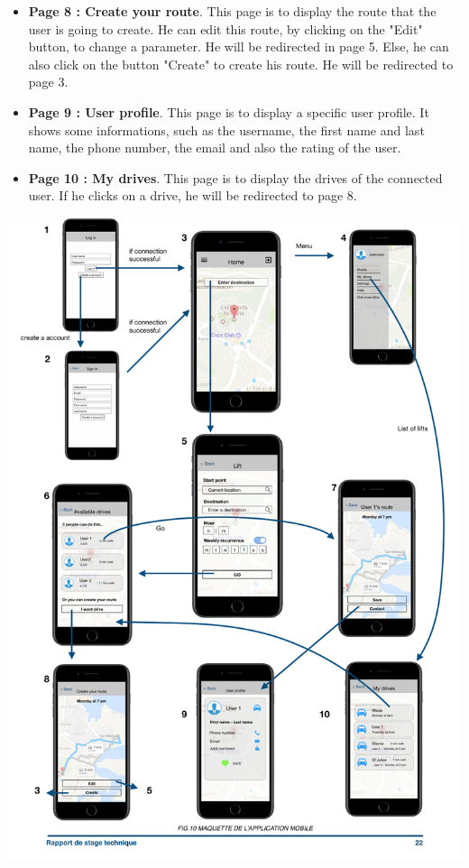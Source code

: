 \begin{itemize}
	\item {\bf Page 8 : Create your route}. This page is to display the route that the user is going to create. He can edit this route, by clicking on the "Edit" button, to change a parameter. He will be redirected in page 5. Else, he can also click on the button "Create" to create his route.  He will be redirected to page 3.
	\item {\bf Page 9 : User profile}. This page is to display a specific user profile. It shows some informations, such as the username, the first name and last name, the phone number, the email and also the rating of the user.
	 \item {\bf Page 10 : My drives}. This page is to display the drives of the connected user. If he clicks on a drive, he will be redirected to page 8.
\end{itemize}
\newpage
\begin{changemargin}{-2.5cm}{-2.5cm}{-3.8cm}
\includegraphics[page=1]{maquettes} 
\end{changemargin}